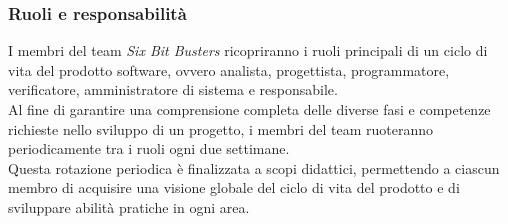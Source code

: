 \subsubsection{Ruoli e responsabilità}
I membri del team \textit{Six Bit Busters} ricopriranno i ruoli principali di un
ciclo di vita del prodotto software, ovvero analista, progettista,
programmatore, verificatore, amministratore di sistema e responsabile. \\ Al
fine di garantire una comprensione completa delle diverse fasi e competenze
richieste nello sviluppo di un progetto, i membri del team ruoteranno
periodicamente tra i ruoli ogni due settimane. \\Questa rotazione periodica è
finalizzata a scopi didattici, permettendo a ciascun membro di acquisire una
visione globale del ciclo di vita del prodotto e di sviluppare abilità pratiche
in ogni area.
